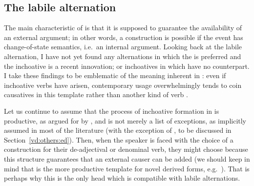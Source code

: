 \begin{exe}
\begin{xlist}
\begin{xlist}
\begin{exe}
\begin{exe}
\begin{xlist}
\begin{exe}
\begin{xlist}
\begin{exe}
\begin{xlist}
\begin{xlist}
\begin{exe}
\begin{xlist}
\begin{exe}
\begin{xlist}
\begin{exe}
\begin{xlist}
\begin{exe}
\begin{exe}
\begin{exe}
\begin{xlist}
\begin{exe}
\begin{exe}
\begin{xlist}
\begin{xlist}
\begin{exe}
\begin{xlist}
\begin{exe}
\begin{exe}
\begin{xlist}
\begin{exe}
\begin{exe}
\begin{xlist}
\begin{exe}
\begin{xlist}
\begin{exe}
\begin{xlist}
\begin{exe}
\begin{xlist}
\begin{exe}
\begin{exe}
\begin{xlist}
\begin{exe}
\begin{exe}
\begin{xlist}
\begin{xlist}
\begin{exe}
\begin{xlist}
\begin{xlist}
\begin{exe}
\begin{xlist}
\begin{exe}
\begin{xlist}
\begin{exe}
\begin{xlist}
\begin{exe}
\begin{xlist}
\begin{exe}
\begin{exe}
\begin{exe}
\begin{exe}
\begin{xlist}
\begin{exe}
\begin{exe}
\begin{xlist}
\begin{xlist}
	\subsection{The labile alternation} \label{vd:caus:labile}
The main characteristic of {\vd} is that it is supposed to guarantee the availability of an external argument; in other words, a  construction is possible if the event has change-of-state semantics, i.e.~an internal argument. Looking back at the labile alternation, I have not yet found any alternations in which the  is preferred and the inchoative is a recent innovation; or inchoatives in {\thif} which have no  counterpart. I take these findings to be emblematic of the  meaning inherent in {\vd}: even if inchoative verbs have arisen, contemporary usage overwhelmingly tends to coin causatives in this template rather than another kind of verb \citep{laks14}.

Let us continue to assume that the process of inchoative formation in {\thif} is productive, as argued for by \cite{lev16}, and is not merely a list of exceptions, as implicitly assumed in most of the literature (with the exception of \citealt{doron03}, to be discussed in Section~\ref{vd:others:ed}). Then, when the speaker is faced with the choice of a construction for their de-adjectival or denominal verb, they might choose {\vd} because this structure guarantees that an external causer can be added (we should keep in mind that {\thit} is the more productive template for novel derived forms, e.g.~\citealt{laks11}). That is perhaps why this is the only head which is compatible with labile alternations.


\end{xlist}
\end{xlist}
\end{exe}
\end{exe}
\end{xlist}
\end{exe}
\end{exe}
\end{exe}
\end{exe}
\end{xlist}
\end{exe}
\end{xlist}
\end{exe}
\end{xlist}
\end{exe}
\end{xlist}
\end{exe}
\end{xlist}
\end{xlist}
\end{exe}
\end{xlist}
\end{xlist}
\end{exe}
\end{exe}
\end{xlist}
\end{exe}
\end{exe}
\end{xlist}
\end{exe}
\end{xlist}
\end{exe}
\end{xlist}
\end{exe}
\end{xlist}
\end{exe}
\end{exe}
\end{xlist}
\end{exe}
\end{exe}
\end{xlist}
\end{exe}
\end{xlist}
\end{xlist}
\end{exe}
\end{exe}
\end{xlist}
\end{exe}
\end{exe}
\end{exe}
\end{xlist}
\end{exe}
\end{xlist}
\end{exe}
\end{xlist}
\end{exe}
\end{xlist}
\end{xlist}
\end{exe}
\end{xlist}
\end{exe}
\end{xlist}
\end{exe}
\end{exe}
\end{xlist}
\end{xlist}
\end{exe}
